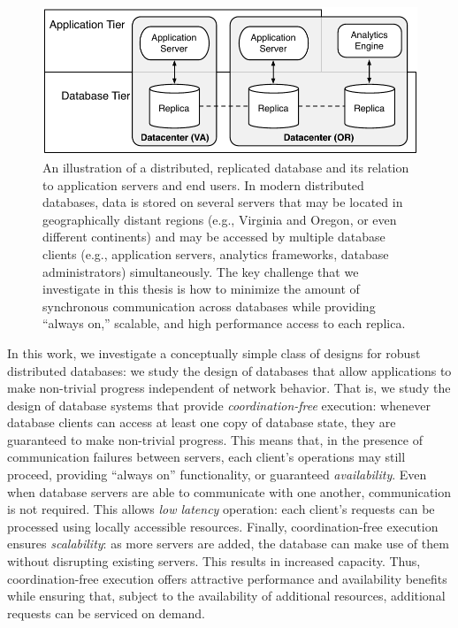 \begin{figure}[t!]
\includegraphics[width=\figscale\columnwidth]{diagram/servers.pdf}
\vspace{.5em}
\caption{An illustration of a distributed, replicated database and its
  relation to application servers and end users. In modern distributed
  databases, data is stored on several servers that may be located in
  geographically distant regions (e.g., Virginia and Oregon, or even
  different continents) and may be accessed by multiple database
  clients (e.g., application servers, analytics frameworks, database
  administrators) simultaneously. The key challenge that we
  investigate in this thesis is how to minimize the amount of
  synchronous communication across databases while providing ``always
  on,'' scalable, and high performance access to each replica.}
\label{fig:servers}
\end{figure}

In this work, we investigate a conceptually simple class of designs
for robust distributed databases: we study the design of databases
that allow applications to make non-trivial progress independent of
network behavior. That is, we study the design of database systems
that provide \textit{coordination-free} execution: whenever database
clients can access at least one copy of database state, they are
guaranteed to make non-trivial progress. This means that, in the
presence of communication failures between servers, each client's
operations may still proceed, providing ``always on'' functionality,
or guaranteed \textit{availability}. Even when database servers are
able to communicate with one another, communication is not
required. This allows \textit{low latency} operation: each client's
requests can be processed using locally accessible resources. Finally,
coordination-free execution ensures \textit{scalability}: as more
servers are added, the database can make use of them without
disrupting existing servers. This results in increased capacity. Thus,
coordination-free execution offers attractive performance and
availability benefits while ensuring that, subject to the availability
of additional resources, additional requests can be serviced on
demand.

